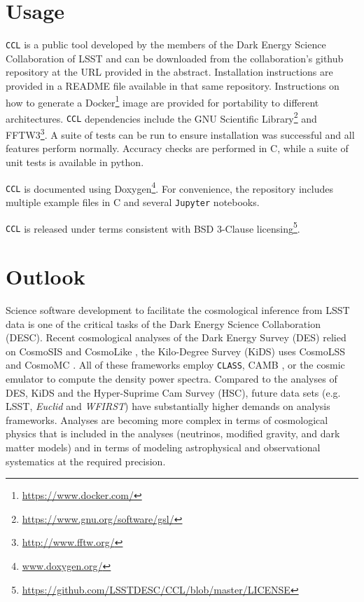 \documentclass[\docopts]{\docclass}
\newcommand{\ccl}{{\tt CCL}\xspace}
\begin{document}


\section{Usage}
\label{sec:usage}

\ccl is a public tool developed by the members of the Dark Energy Science Collaboration of LSST and can be downloaded from the collaboration's github repository at the URL provided in the abstract. Installation instructions are provided in a README file available in that same repository. Instructions on how to generate a Docker\footnote{\url{https://www.docker.com/}} image are provided for portability to different architectures. \ccl dependencies include the GNU Scientific Library\footnote{\url{https://www.gnu.org/software/gsl/}} and FFTW3\footnote{\url{http://www.fftw.org/}}. A suite of tests can be run to ensure installation was successful and all features perform normally. Accuracy checks are performed in C, while a suite of unit tests is available in python.

\ccl is documented using Doxygen\footnote{\url{www.doxygen.org/}}. For convenience, the repository includes multiple example files in C and several {\tt Jupyter} notebooks.

\ccl is released under terms consistent with BSD 3-Clause licensing\footnote{\url{https://github.com/LSSTDESC/CCL/blob/master/LICENSE}}.

\section{Outlook}
\label{sec:conclusion}

Science software development to facilitate the cosmological inference from LSST data is one of the critical tasks of the Dark Energy Science Collaboration (DESC). Recent cosmological analyses of the Dark Energy Survey (DES) relied on CosmoSIS \citep{Zuntz14} and CosmoLike \citep{krause17}, the Kilo-Degree Survey (KiDS) uses CosmoLSS \cite{Joudaki18} and CosmoMC \citep{Lewis02}. All of these frameworks employ {\tt CLASS}, CAMB \citep{Challinor2005}, or the cosmic emulator to compute the density power spectra. Compared to the analyses of DES, KiDS and the Hyper-Suprime Cam Survey (HSC), future data sets (e.g. LSST, {\it Euclid} and {\it WFIRST}) have substantially higher demands on analysis frameworks. Analyses are becoming more complex in terms of cosmological physics that is included in the analyses (neutrinos, modified gravity, and dark matter models) and in terms of modeling astrophysical and observational systematics at the required precision. 
\end{document}
